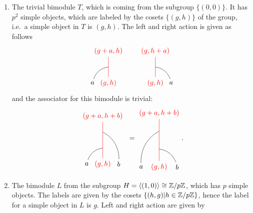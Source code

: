 	\begin{enumerate}
		\item The trivial bimodule $T$, which is coming from the subgroup $\{(0,0)\}$. It has $p^2$ simple objects, which are labeled by the cosets $\{(g,h)\}$ of the group, i.e.\ a simple object in $T$ is $(g,h)$. The left and right action is given as follows
			\begin{equation}
				\begin{tikzpicture}[scale=0.8,baseline=(current bounding box.center)]
				\node[red](m) at (0,0) {$(g,h)$};
				\node(b) at (-1,0) {$a$};
				\node[red](abm) at (0,2) {$(g+a,h)$};
				\draw[red] (m)-- (abm);
				\draw (b) to [bend left] (0,1);
				\end{tikzpicture}\hspace{20pt}
				\begin{tikzpicture}[scale=0.8,baseline=(current bounding box.center)]
				\node[red](m) at (0,0) {$(g,h)$};
				\node(b) at (1,0) {$a$};
				\node[red](abm) at (0,2) {$(g,h+a)$};
				\draw[red] (m)-- (abm);
				\draw (b) to [bend right] (0,1);
				\end{tikzpicture}
			\end{equation}
		\noindent
		and the associator for this bimodule is trivial:
			\begin{equation}
				\begin{tikzpicture}[scale=0.8,baseline=(current bounding box.center)]
				\node[red](m) at (0,0) {$(g,h)$};
				\node(a) at (-1,0) {$a$};
				\node(b) at (1,0) {$b$};
				\node[red](abm) at (0,3) {$(g+a,h+b)$};
				\draw[red] (m) -- (abm);
				\draw (a) to [bend left] (0,1);
				\draw (b) to [bend right] (0,2);
				\end{tikzpicture}\ =
				\begin{tikzpicture}[scale=0.9,baseline=(current bounding box.center)]
				\node[red](m) at (0,0) {$(g,h)$};
				\node(a) at (-1,0) {$a$};
				\node(b) at (1,0) {$b$};
				\node[red](abm) at (0,3) {$(g+a,h+b)$};
				\draw[red] (m) -- (abm);
				\draw (b) to [bend right] (0,1);
				\draw (a) to [bend left] (0,2);
				\end{tikzpicture}.
			\end{equation}
		\item The bimodule $L$ from the subgroup $H=\langle(1,0)\rangle\cong \mathbb{Z}/p\mathbb{Z}$, which has $p$ simple objects. The labels are given by the cosets $\{(h,g)|h\in\mathbb{Z}/p\mathbb{Z}\}$, hence the label for a simple object in $L$ is $g$. Left and right action are given by 
			\begin{equation}

\end{equation}
\end{enumerate}
